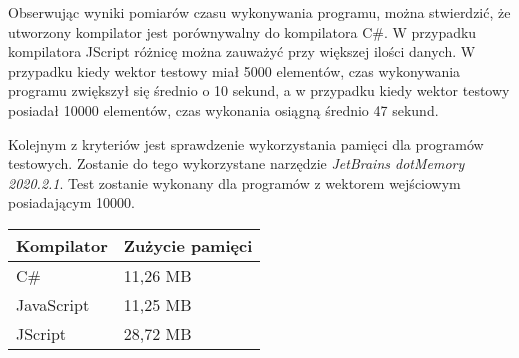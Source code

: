
\par Obserwując wyniki pomiarów czasu wykonywania programu, można stwierdzić, że utworzony kompilator jest porównywalny do kompilatora C\#. W przypadku kompilatora JScript różnicę można zauważyć przy większej ilości danych. W przypadku kiedy wektor testowy miał 5000 elementów, czas wykonywania programu zwiększył się średnio o 10 sekund, a w przypadku kiedy wektor testowy posiadał 10000 elementów, czas wykonania osiągną średnio 47 sekund.

\par Kolejnym z kryteriów jest sprawdzenie wykorzystania pamięci dla programów testowych. Zostanie do tego wykorzystane narzędzie \textit{JetBrains dotMemory 2020.2.1}. Test zostanie wykonany dla programów z wektorem wejściowym posiadającym 10000.

\begin{table}[h!]
  \centering
  \begin{tabular}{|l|l|}
  \hline
  Kompilator & Zużycie pamięci \\ \hline
  C\# & 11,26 MB \\ \hline
  JavaScript & 11,25 MB \\ \hline
  JScript & 28,72 MB \\ \hline
  \end{tabular}
\end{table}

